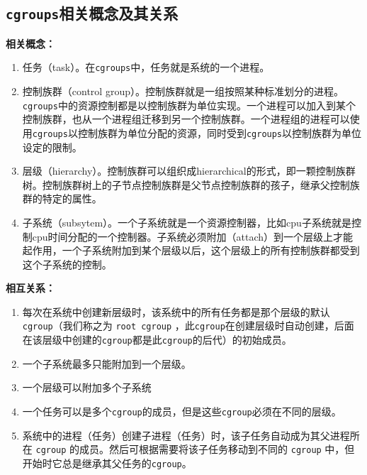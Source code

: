 \documentclass[doctor,openright,twoside]{sjtuthesis}
\providecommand{\tightlist}{%
    \setlength{\itemsep}{0pt}\setlength{\parskip}{0pt}}
\newcommand{\passthrough}[1]{#1}
\theoremstyle{plain}
\theoremstyle{definition}
\theoremstyle{remark}
\theoremstyle{ocrenumbox}
\theoremstyle{plain}
\begin{document}
\hypertarget{cgroups}{%
\subsection{\texorpdfstring{\texttt{cgroups}相关概念及其关系}{cgroups相关概念及其关系}}\label{cgroups}}

\textbf{相关概念：}

\begin{enumerate}
\def\labelenumi{\arabic{enumi}.}
\tightlist
\item
  任务（task）。在\passthrough{\lstinline!cgroups!}中，任务就是系统的一个进程。
\item
  控制族群（control
  group）。控制族群就是一组按照某种标准划分的进程。\passthrough{\lstinline!cgroups!}中的资源控制都是以控制族群为单位实现。一个进程可以加入到某个控制族群，也从一个进程组迁移到另一个控制族群。一个进程组的进程可以使用\passthrough{\lstinline!cgroups!}以控制族群为单位分配的资源，同时受到\passthrough{\lstinline!cgroups!}以控制族群为单位设定的限制。
\item
  层级（hierarchy）。控制族群可以组织成hierarchical的形式，即一颗控制族群树。控制族群树上的子节点控制族群是父节点控制族群的孩子，继承父控制族群的特定的属性。
\item
  子系统（subsytem）。一个子系统就是一个资源控制器，比如cpu子系统就是控制cpu时间分配的一个控制器。子系统必须附加（attach）到一个层级上才能起作用，一个子系统附加到某个层级以后，这个层级上的所有控制族群都受到这个子系统的控制。
\end{enumerate}

\textbf{相互关系：}

\begin{enumerate}
\def\labelenumi{\arabic{enumi}.}
\tightlist
\item
  每次在系统中创建新层级时，该系统中的所有任务都是那个层级的默认
  \passthrough{\lstinline!cgroup!}（我们称之为
  \passthrough{\lstinline!root cgroup!}
  ，此\passthrough{\lstinline!cgroup!}在创建层级时自动创建，后面在该层级中创建的\passthrough{\lstinline!cgroup!}都是此\passthrough{\lstinline!cgroup!}的后代）的初始成员。
\item
  一个子系统最多只能附加到一个层级。
\item
  一个层级可以附加多个子系统
\item
  一个任务可以是多个\passthrough{\lstinline!cgroup!}的成员，但是这些\passthrough{\lstinline!cgroup!}必须在不同的层级。
\item
  系统中的进程（任务）创建子进程（任务）时，该子任务自动成为其父进程所在
  \passthrough{\lstinline!cgroup!}
  的成员。然后可根据需要将该子任务移动到不同的
  \passthrough{\lstinline!cgroup!}
  中，但开始时它总是继承其父任务的\passthrough{\lstinline!cgroup!}。
\end{enumerate}
\end{document}
